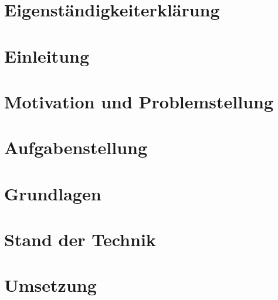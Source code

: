 \documentclass[
	ngerman,
	a4paper,
	twoside
]{scrbook}
\begin{document}
\chapter*{Eigenständigkeiterklärung}




	\tableofcontents
	\listoffigures
	\listoftables
	\lstlistoflistings
	\printnoidxglossary[type=\acronymtype]


\chapter{Einleitung}
	
	
\chapter{Motivation und Problemstellung}	

	
	
\chapter{Aufgabenstellung}



\chapter{Grundlagen}



\chapter{Stand der Technik}



\chapter{Umsetzung}













	\printbibliography
\end{document}

